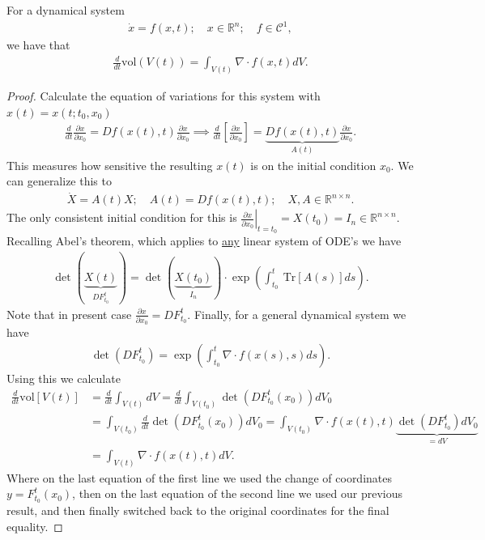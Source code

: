 \begin{theorem}[Liouville]
	For a dynamical system
	\begin{align}
		\dot{x} = f(x,t);\quad x \in \mathbb{R}^{n};\quad f\in\mathcal{C}^{1},
	\end{align}
	we have that
	\begin{align}
		\boxed{
			\frac{d}{dt} \textrm{vol} (V(t)) = \int_{V(t)}^{} \nabla \cdot f(x,t) dV.
		}
	\end{align}
\end{theorem}
\begin{proof}
	Calculate the equation of variations for this system with $x(t) = x(t;t_0, x_0)$
	\begin{align}
		\frac{d}{dt}\frac{\partial {x}}{\partial x_0} = Df(x(t),t) \frac{\partial x}{\partial x_0} \implies \frac{d}{dt}\left[ \frac{\partial x}{\partial x_0}\right] = \underbrace{Df(x(t),t)}_{A(t)}\frac{\partial x}{\partial x_0}.
	\end{align}
	This measures how sensitive the resulting $x(t)$ is on the initial condition $x_0$. We can generalize this to 
	\begin{align}
		\dot{X} = A(t) X;\quad A(t) = Df(x(t),t);\quad X,A \in \mathbb{R}^{n\times n}.
	\end{align}
	The only consistent initial condition for this is $\left.\frac{\partial x}{\partial x_0}\right|_{t=t_0}=X(t_0) = I_{n} \in \mathbb{R}^{n\times n}$. Recalling Abel's theorem, which applies to \underline{any} linear system of ODE's we have
		\begin{align}
			\det(\underbrace{X(t)}_{DF_{t_0}^{t}}) = \det(\underbrace{X(t_0)}_{I_{n}})\cdot \exp\left(\int_{t_0}^{t} \ \textrm{Tr} [A(s)]ds\right).
		\end{align}
	Note that in present case $\frac{\partial x}{\partial x_0}=DF_{t_0}^{t}$. Finally, for a general dynamical system we have
	\begin{align}
		\det\left(DF_{t_0}^{t}\right) = \exp \left( \int_{t_0}^{t} \nabla \cdot f(x(s), s) ds \right).
	\end{align}
	Using this we calculate
\begin{subequations}
	\begin{align}
		\frac{d}{dt}  \textrm{vol}\left[V(t)\right] 
		&= \frac{d}{dt}\int_{V(t)}^{} dV 
		= \frac{d}{dt} \int_{V(t_0)}^{} \det\left(DF_{t_0}^{t}(x_0) \right) dV_0 \\
		&= \int_{V(t_0)}^{} \frac{d}{dt}\det\left(DF_{t_0}^{t}(x_0) \right) dV_0
		= \int_{V(t_0)}^{} \nabla \cdot f(x(t),t) \underbrace{\det\left(DF_{t_0}^{t}\right) dV_0}_{=dV}\\
		&= \int_{V(t)}^{} \nabla \cdot f(x(t),t) dV.
	\end{align}
\end{subequations}
Where on the last equation of the first line we used the change of coordinates $y = F_{t_0}^{t}(x_0)$, then on the last equation of the second line we used our previous result, and then finally switched back to the original coordinates for the final equality.	
\end{proof}


